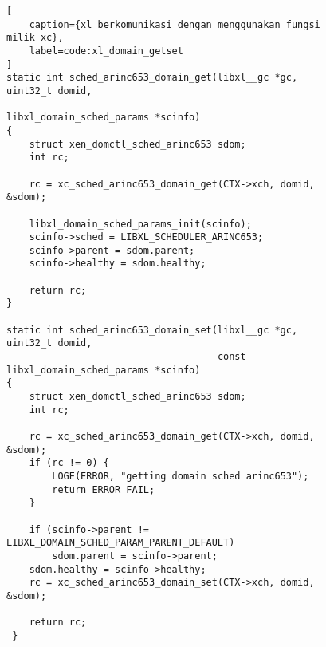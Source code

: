 \begin{figure}
\begin{lstlisting}[
	caption={xl berkomunikasi dengan menggunakan fungsi milik xc},
	label=code:xl_domain_getset
]
static int sched_arinc653_domain_get(libxl__gc *gc, uint32_t domid,
                                   libxl_domain_sched_params *scinfo)
{
    struct xen_domctl_sched_arinc653 sdom;
    int rc;

    rc = xc_sched_arinc653_domain_get(CTX->xch, domid, &sdom);

    libxl_domain_sched_params_init(scinfo);
    scinfo->sched = LIBXL_SCHEDULER_ARINC653;
    scinfo->parent = sdom.parent;
    scinfo->healthy = sdom.healthy;

    return rc;
}

static int sched_arinc653_domain_set(libxl__gc *gc, uint32_t domid,
                                     const libxl_domain_sched_params *scinfo)
{
    struct xen_domctl_sched_arinc653 sdom;
    int rc;

    rc = xc_sched_arinc653_domain_get(CTX->xch, domid, &sdom);
    if (rc != 0) {
        LOGE(ERROR, "getting domain sched arinc653");
        return ERROR_FAIL;
    }

    if (scinfo->parent != LIBXL_DOMAIN_SCHED_PARAM_PARENT_DEFAULT)
        sdom.parent = scinfo->parent;
    sdom.healthy = scinfo->healthy;
    rc = xc_sched_arinc653_domain_set(CTX->xch, domid, &sdom);

    return rc;
 }
\end{lstlisting}
\end{figure}





